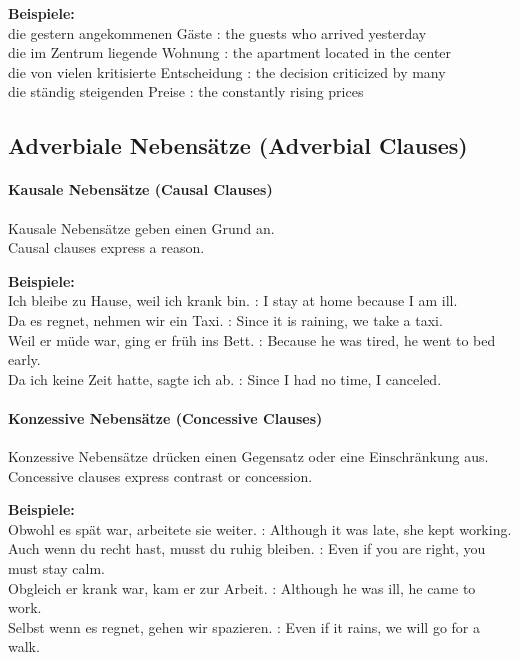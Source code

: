 \documentclass[a4paper]{article}
\begin{document}
            \textbf{Beispiele:}\\
            die gestern angekommenen Gäste : the guests who arrived yesterday\\
            die im Zentrum liegende Wohnung : the apartment located in the center\\
            die von vielen kritisierte Entscheidung : the decision criticized by many\\
            die ständig steigenden Preise : the constantly rising prices
    
    \subsection{Adverbiale Nebensätze {\small (Adverbial Clauses)}}
    
    \paragraph{Kausale Nebensätze {\small (Causal Clauses)}}
        Kausale Nebensätze geben einen Grund an.\\
        Causal clauses express a reason.
        
        \textbf{Beispiele:}\\
        Ich bleibe zu Hause, weil ich krank bin. : I stay at home because I am ill.\\
        Da es regnet, nehmen wir ein Taxi. : Since it is raining, we take a taxi.\\
        Weil er müde war, ging er früh ins Bett. : Because he was tired, he went to bed early.\\
        Da ich keine Zeit hatte, sagte ich ab. : Since I had no time, I canceled.
    
    \paragraph{Konzessive Nebensätze {\small (Concessive Clauses)}}
        Konzessive Nebensätze drücken einen Gegensatz oder eine Einschränkung aus.\\
        Concessive clauses express contrast or concession.
        
        \textbf{Beispiele:}\\
        Obwohl es spät war, arbeitete sie weiter. : Although it was late, she kept working.\\
        Auch wenn du recht hast, musst du ruhig bleiben. : Even if you are right, you must stay calm.\\
        Obgleich er krank war, kam er zur Arbeit. : Although he was ill, he came to work.\\
        Selbst wenn es regnet, gehen wir spazieren. : Even if it rains, we will go for a walk.
    
\end{document}
